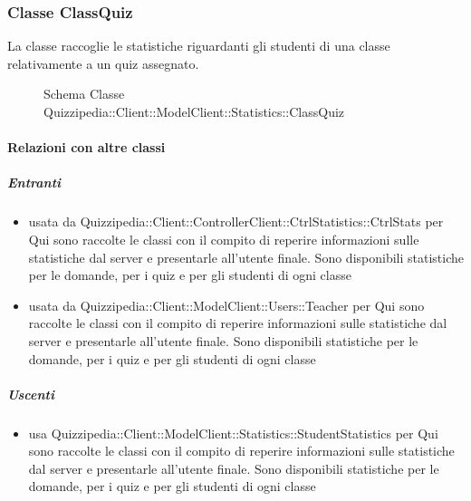 \subsubsection{Classe ClassQuiz}
La classe raccoglie le statistiche riguardanti gli studenti di una classe relativamente a un quiz assegnato.
\begin{figure}[H]
\centering
\noindent{}
\caption[Schema Classe ClassQuiz]{Schema Classe Quizzipedia::Client::ModelClient::Statistics::ClassQuiz}
\end{figure}
\paragraph{Relazioni con altre classi}
\subparagraph{Entranti}
\begin{itemize}
\item usata da Quizzipedia::Client::ControllerClient::CtrlStatistics::CtrlStats per Qui sono raccolte le classi con il compito di reperire informazioni sulle statistiche dal server e presentarle all'utente finale. Sono disponibili statistiche per le domande, per i quiz e per gli studenti di ogni classe
\item usata da Quizzipedia::Client::ModelClient::Users::Teacher per Qui sono raccolte le classi con il compito di reperire informazioni sulle statistiche dal server e presentarle all'utente finale. Sono disponibili statistiche per le domande, per i quiz e per gli studenti di ogni classe
\end{itemize}
\subparagraph{Uscenti}
\begin{itemize}
\item usa Quizzipedia::Client::ModelClient::Statistics::StudentStatistics per Qui sono raccolte le classi con il compito di reperire informazioni sulle statistiche dal server e presentarle all'utente finale. Sono disponibili statistiche per le domande, per i quiz e per gli studenti di ogni classe
\end{itemize}
